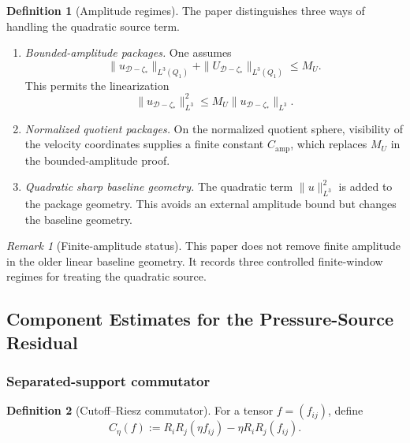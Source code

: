 \documentclass[11pt]{article}
\numberwithin{equation}{section}
\theoremstyle{definition}
\newtheorem{definition}[definition]{Definition}
\theoremstyle{remark}
\newtheorem{remark}[remark]{Remark}
\newcommand{\calD}{\mathcal D}
\newcommand{\Qone}{Q_1}
\begin{document}
\begin{definition}[Amplitude regimes]
\label{ps:def:amplitude-regimes}
The paper distinguishes three ways of handling the quadratic source term.

\begin{enumerate}[label=\textbf{Regime \Roman*.},leftmargin=*]
    \item \emph{Bounded-amplitude packages.}  One assumes
    \[
        \|u_{\calD-\zeta_*}\|_{L^3(\Qone)}
        +
        \|U_{\calD-\zeta_*}\|_{L^3(\Qone)}
        \le M_U.
    \]
    This permits the linearization
    \[
        \|u_{\calD-\zeta_*}\|_{L^3}^2
        \le
        M_U\|u_{\calD-\zeta_*}\|_{L^3}.
    \]

    \item \emph{Normalized quotient packages.}  On the normalized quotient
    sphere, visibility of the velocity coordinates supplies a finite constant
    \(C_{\mathrm{amp}}\), which replaces \(M_U\) in the bounded-amplitude
    proof.

    \item \emph{Quadratic sharp baseline geometry.}  The quadratic term
    \(\|u\|_{L^3}^2\) is added to the package geometry.  This avoids an
    external amplitude bound but changes the baseline geometry.
\end{enumerate}
\end{definition}

\begin{remark}[Finite-amplitude status]
This paper does not remove finite amplitude in the older linear baseline
geometry.  It records three controlled finite-window regimes for treating the
quadratic source.
\end{remark}

\subsection{Component Estimates for the Pressure-Source Residual}
\label{ps:sec:component-estimates}

\subsubsection{Separated-support commutator}

\begin{definition}[Cutoff--Riesz commutator]
\label{ps:def:cutoff-riesz-commutator}
For a tensor \(f=(f_{ij})\), define
\[
    C_\eta(f)
    :=
    R_iR_j(\eta f_{ij})-\eta R_iR_j(f_{ij}).
\]
\end{definition}
\end{document}
